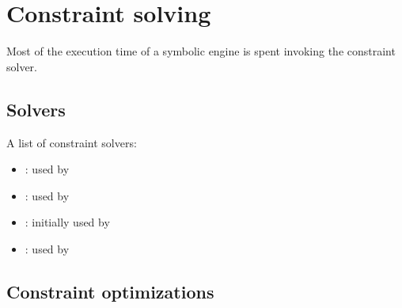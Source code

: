 \section{Constraint solving}

Most of the execution time of a symbolic engine is spent invoking the constraint solver.

\subsection{Solvers}
A list of constraint solvers:
\begin{itemize}
  \item \cite{STP-TR07}: used by~\cite{EXE-CCS06,KLEE-OSDI08,MineSweeper-BOTNET08}
  \item \cite{Z3-TACS08}: used by~\cite{FIRMALICE-NDSS15,MAYHEM-SP12}
  \item \cite{DISSOLVER-TR03}: initially used by \cite{SAGE-NDSS08}
  \item \cite{PPL-SCP08}: used by \cite{AEG-NDSS11}
\end{itemize}

\subsection{Constraint optimizations}

